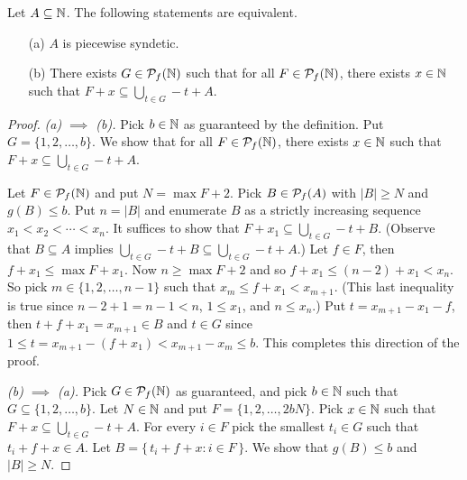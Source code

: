 \begin{prop}
  Let $A \subseteq \mathbb{N}$.
  The following statements are equivalent.
  \begin{itemize}
    \item[(a)] $A$ is piecewise syndetic.
    
    \item[(b)] There exists $G \in \mathcal{P}_f(\mathbb{N})$ such that for all $F \in \mathcal{P}_f(\mathbb{N})$, there exists $x \in \mathbb{N}$ such that $F+x \subseteq \bigcup_{t \in G} -t+A$. 
  \end{itemize}
\end{prop}
\begin{proof}
  \textsl{(a) $\implies$ (b).}
  Pick $b \in \mathbb{N}$ as guaranteed by the definition. 
  Put $G = \{1, 2, \ldots, b\}$.
  We show that for all $F \in \mathcal{P}_f(\mathbb{N})$, there exists $x \in \mathbb{N}$ such that $F+x \subseteq \bigcup_{t \in G} -t + A$.

  Let $F \in \mathcal{P}_f(\mathbb{N})$ and put $N =  \max F + 2$. 
  Pick $B \in \mathcal{P}_f(A)$ with $|B| \ge N$ and $g(B) \le b$. 
  Put $n = |B|$ and enumerate $B$ as a strictly increasing sequence $x_1 < x_2 < \cdots  < x_n$.
  It suffices to show that $F + x_1 \subseteq \bigcup_{t \in G} -t + B$.
  (Observe that $B \subseteq A$ implies $\bigcup_{t \in G} -t + B \subseteq \bigcup_{t \in G} -t + A$.)
  Let $f \in F$, then $f + x_1 \le \max F + x_1$. 
  Now $n \ge \max F + 2$ and so $f + x_1 \le (n-2) + x_1 < x_n$. 
  So pick $m \in \{1, 2, \ldots, n-1\}$ such that $x_m \le f+x_1  < x_{m+1}$. 
  (This last inequality is true since $n-2+1 = n-1 < n$, $1 \le x_1$, and $n \le x_n$.)
  Put $t = x_{m+1} - x_1 - f$, then $t + f + x_1 = x_{m+1} \in B$ and $t \in G$ since $1 \le t = x_{m+1}- (f + x_1) < x_{m+1} - x_m \le b$. 
  This completes this direction of the proof.  
  
  \textsl{(b) $\implies$ (a).}
  Pick $G \in \mathcal{P}_f(\mathbb{N})$ as guaranteed, and pick $b \in \mathbb{N}$ such that $G \subseteq \{1, 2, \ldots, b\}$. 
  Let $N \in \mathbb{N}$ and put $F = \{1, 2, \ldots, 2bN\}$. 
  Pick $x \in \mathbb{N}$ such that $F + x \subseteq \bigcup_{t \in G} -t+A$. 
  For every $i \in F$ pick the smallest $t_i \in G$ such that $t_i + f + x \in A$. 
  Let $B = \{\, t_i + f + x : i \in F \,\}$.
  We show that $g(B) \le b$ and $|B| \ge N$.


\end{proof}

